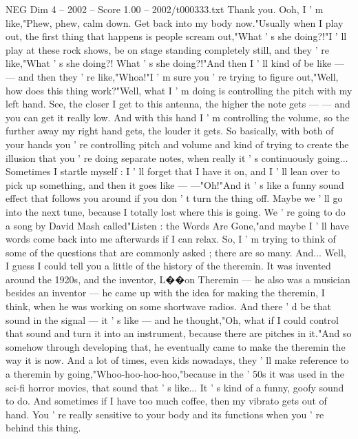 \begin{textsample}{NEG Dim 4 – 2002 – Score 1.00 – 2002/t000333.txt}  \label{ex:f4_neg_058}
Thank you.
Ooh, I ' m like,"Phew, phew, calm down.
Get back into my body now."Usually when I play out, the first thing that happens is people scream out,"What ' s she doing?!"I ' ll play at these rock shows, be on stage standing completely still, and they ' re like,"What ' s she doing?!
What ' s she doing?!"And then I ' ll kind of be like — — and then they ' re like,"Whoa!"I ' m sure you ' re trying to figure out,"Well, how does this thing work?"Well, what I ' m doing is controlling the pitch with my left hand.
See, the closer I get to this antenna, the higher the note gets — — and you can get it really low.
And with this hand I ' m controlling the volume, so the further away my right hand gets, the louder it gets.
So basically, with both of your hands you ' re controlling pitch and volume and kind of trying to create the illusion that you ' re doing separate notes, when really it ' s continuously going...
Sometimes I startle myself : I ' ll forget that I have it on, and I ' ll lean over to pick up something, and then it goes like — —"Oh!"And it ' s like a funny sound effect that follows you around if you don ' t turn the thing off.
Maybe we ' ll go into the next tune, because I totally lost where this is going.
We ' re going to do a song by David Mash called"Listen : the Words Are Gone,"and maybe I ' ll have words come back into me afterwards if I can relax.
So, I ' m trying to think of some of the questions that are commonly asked ; there are so many.
And...
Well, I guess I could tell you a little of the history of the theremin.
It was invented around the 1920s, and the inventor, L{\EmojiFont �}{\EmojiFont �}on Theremin — he also was a musician besides an inventor — he came up with the idea for making the theremin, I think, when he was working on some shortwave radios.
And there ' d be that sound in the signal — it ' s like — and he thought,"Oh, what if I could control that sound and turn it into an instrument, because there are pitches in it."And so somehow through developing that, he eventually came to make the theremin the way it is now.
And a lot of times, even kids nowadays, they ' ll make reference to a theremin by going,"Whoo-hoo-hoo-hoo,"because in the ' 50s it was used in the sci-fi horror movies, that sound that ' s like...
It ' s kind of a funny, goofy sound to do.
And sometimes if I have too much coffee, then my vibrato gets out of hand.
You ' re really sensitive to your body and its functions when you ' re behind this thing.

\end{textsample}
